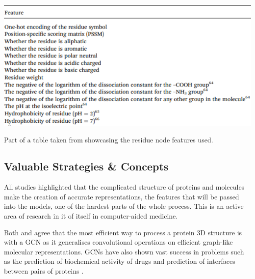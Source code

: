 \begin{table}[!h]
  \centering
  \includegraphics[width=1.0\linewidth]{images/Jiang_Residue_Node_Features.pdf}
   \caption{Part of a table taken from \citet{Jiang2020} showcasing the residue node features used.}
  \label{tbl:Jiang_Residue_Node_Features}
\end{table}

\pagebreak

\subsection{Valuable Strategies \& Concepts}

All studies highlighted that the complicated structure of proteins and molecules make the creation of accurate representations, the features that will be passed into the models, one of the hardest parts of the whole process. This is an active area of research in it of itself in computer-aided medicine. \citep{Jiang2020}

Both \citet{Jiang2020} and \citet{Gligorijević} agree that the most efficient way to process a protein 3D structure is with a GCN as it generalises convolutional operations on efficient graph-like molecular representations. GCNs have also shown vast success in problems such as the prediction of biochemical activity of drugs and prediction of interfaces between pairs of proteins \citep{Gligorijević}.